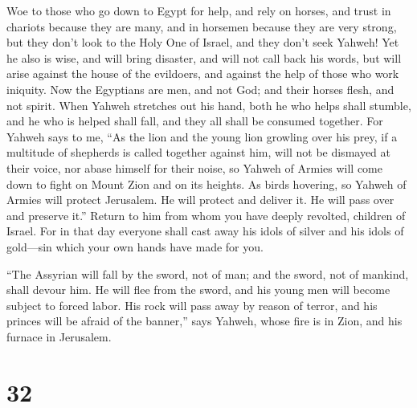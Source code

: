  Woe to those who go down to Egypt for help, and rely on
horses, and trust in chariots because they are many, and in horsemen
because they are very strong, but they don't look to the Holy One of
Israel, and they don't seek Yahweh!  Yet he also is wise,
and will bring disaster, and will not call back his words, but will
arise against the house of the evildoers, and against the help of those
who work iniquity.  Now the Egyptians are men, and not
God; and their horses flesh, and not spirit. When Yahweh stretches out
his hand, both he who helps shall stumble, and he who is helped shall
fall, and they all shall be consumed together.  For Yahweh
says to me, ``As the lion and the young lion growling over his prey, if
a multitude of shepherds is called together against him, will not be
dismayed at their voice, nor abase himself for their noise, so Yahweh of
Armies will come down to fight on Mount Zion and on its heights.
 As birds hovering, so Yahweh of Armies will protect
Jerusalem. He will protect and deliver it. He will pass over and
preserve it.''  Return to him from whom you have deeply
revolted, children of Israel.  For in that day everyone
shall cast away his idols of silver and his idols of gold---sin which
your own hands have made for you.

 ``The Assyrian will fall by the sword, not of man; and
the sword, not of mankind, shall devour him. He will flee from the
sword, and his young men will become subject to forced labor.
 His rock will pass away by reason of terror, and his
princes will be afraid of the banner,'' says Yahweh, whose fire is in
Zion, and his furnace in Jerusalem.

\hypertarget{section-31}{%
\section{32}\label{section-31}}

